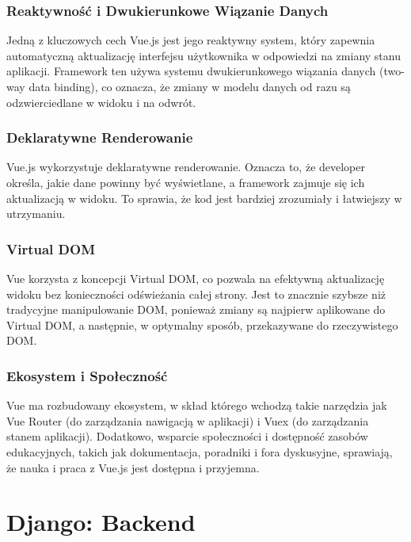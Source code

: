 \subsubsection*{Reaktywność i Dwukierunkowe Wiązanie Danych}

Jedną z kluczowych cech Vue.js jest jego reaktywny system, który zapewnia automatyczną aktualizację interfejsu użytkownika w odpowiedzi na zmiany stanu aplikacji. Framework ten używa systemu dwukierunkowego wiązania danych (two-way data binding), co oznacza, że zmiany w modelu danych od razu są odzwierciedlane w widoku i na odwrót.

\subsubsection*{Deklaratywne Renderowanie}

Vue.js wykorzystuje deklaratywne renderowanie. Oznacza to, że developer określa, jakie dane powinny być wyświetlane, a framework zajmuje się ich aktualizacją w widoku. To sprawia, że kod jest bardziej zrozumiały i łatwiejszy w utrzymaniu.

\subsubsection*{Virtual DOM}

Vue korzysta z koncepcji Virtual DOM, co pozwala na efektywną aktualizację widoku bez konieczności odświeżania całej strony. Jest to znacznie szybsze niż tradycyjne manipulowanie DOM, ponieważ zmiany są najpierw aplikowane do Virtual DOM, a następnie, w optymalny sposób, przekazywane do rzeczywistego DOM.

\subsubsection*{Ekosystem i Społeczność}

Vue ma rozbudowany ekosystem, w skład którego wchodzą takie narzędzia jak Vue Router (do zarządzania nawigacją w aplikacji) i Vuex (do zarządzania stanem aplikacji). Dodatkowo, wsparcie społeczności i dostępność zasobów edukacyjnych, takich jak dokumentacja, poradniki i fora dyskusyjne, sprawiają, że nauka i praca z Vue.js jest dostępna i przyjemna.


\newpage
\section{Django: Backend}


